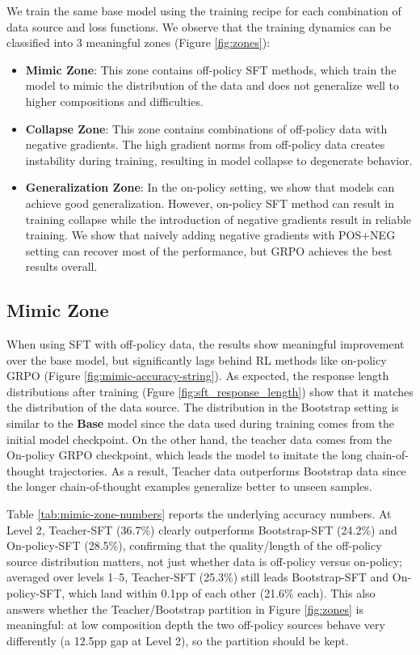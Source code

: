 \documentclass{article}
\begin{document}
We train the same base model using the training recipe for each combination of data source and loss functions. We observe that the training dynamics can be classified into 3 meaningful zones (Figure \ref{fig:zones}): 
\begin{itemize}
    \item \textbf{Mimic Zone}: This zone contains off-policy SFT methods, which train the model to mimic the distribution of the data and does not generalize well to higher compositions and difficulties.
    \item \textbf{Collapse Zone}: This zone contains combinations of off-policy data with negative gradients. The high gradient norms from off-policy data creates instability during training, resulting in model collapse to degenerate behavior.
    \item \textbf{Generalization Zone}: In the on-policy setting, we show that models can achieve good generalization. However, on-policy SFT method can result in training collapse while the introduction of negative gradients result in reliable training. We show that naively adding negative gradients with POS+NEG setting can recover most of the performance, but GRPO achieves the best results overall.
\end{itemize}


\subsection{Mimic Zone}

When using SFT with off-policy data, the results show meaningful improvement over the base model, but significantly lags behind RL methods like on-policy GRPO (Figure \ref{fig:mimic-accuracy-string}).
As expected, the response length distributions after training (Fgure \ref{fig:sft_response_length}) show that it matches the distribution of the data source.
The distribution in the Bootstrap setting is similar to the \textbf{Base} model since the data used during training comes from the initial model checkpoint. On the other hand, the teacher data comes from the On-policy GRPO checkpoint, which leads the model to imitate the long chain-of-thought trajectories. As a result, Teacher data outperforms Bootstrap data since the longer chain-of-thought examples generalize better to unseen samples.

Table \ref{tab:mimic-zone-numbers} reports the underlying accuracy numbers. At Level 2, Teacher-SFT (36.7\%) clearly outperforms Bootstrap-SFT (24.2\%) and On-policy-SFT (28.5\%), confirming that the quality/length of the off-policy source distribution matters, not just whether data is off-policy versus on-policy; averaged over levels 1--5, Teacher-SFT (25.3\%) still leads Bootstrap-SFT and On-policy-SFT, which land within 0.1pp of each other (21.6\% each). This also answers whether the Teacher/Bootstrap partition in Figure \ref{fig:zones} is meaningful: at low composition depth the two off-policy sources behave very differently (a 12.5pp gap at Level 2), so the partition should be kept.
\end{document}
